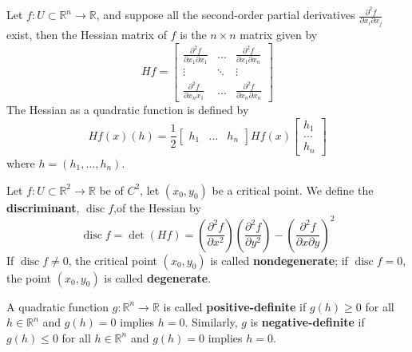 \documentclass[openany]{book}
\newcommand{\R}{\mathbb{R}}
\DeclareMathOperator{\disc}{disc}
\begin{document}
\begin{defn}
    Let $f:U\subset\R^n\to\R$, and suppose all the second-order partial derivatives $\frac{\partial^2 f}{\partial x_i\partial x_j}$ exist, then the Hessian matrix of $f$ is the $n\times n$ matrix given by 
    \begin{equation*}
        Hf=\begin{bmatrix}
            \frac{\partial^2 f}{\partial x_1\partial x_1}&\dots&\frac{\partial^2f}{\partial x_1\partial x_n}\\
            \vdots&\ddots&\vdots\\
            \frac{\partial^2f}{\partial x_nx_1}&\dots&\frac{\partial^2f}{\partial x_n\partial x_n}
        \end{bmatrix}
    \end{equation*}
    The Hessian as a quadratic function is defined by 
    \begin{equation*}
        Hf(x)(h)=\frac{1}{2}\begin{bmatrix}
            h_1&\dots&h_n
        \end{bmatrix}Hf(x)\begin{bmatrix}
            h_1\\
            \dots\\
            h_n
        \end{bmatrix}
    \end{equation*}
    where $h=(h_1,\dots,h_n)$.
\end{defn}

\begin{defn}
    Let $f:U\subset\R^2\to\R$ be of $C^2$, let $(x_0,y_0)$ be a critical point. We define the \textbf{discriminant}, \boldmath $\disc f$,\unboldmath of the Hessian by
    \begin{equation*}
        \disc f=\det (Hf)=\left(\frac{\partial^2f}{\partial x^2}\right)\left(\frac{\partial^2f}{\partial y^2}\right)-\left(\frac{\partial^2f}{\partial x\partial y}\right)^2
    \end{equation*}
    If $\disc f\neq 0$, the critical point $(x_0,y_0)$ is called \textbf{nondegenerate}; if $\disc f=0$, the point $(x_0,y_0)$ is called \textbf{degenerate}.
\end{defn}

\begin{defn}
    A quadratic function $g:\R^n\to\R$ is called \textbf{positive-definite} if $g(h)\geq 0$ for all $h\in\R^n$ and $g(h)=0$ implies $h=0$. Similarly, $g$ is \textbf{negative-definite} if $g(h)\leq 0$ for all $h\in\R^n$ and $g(h)=0$ implies $h=0$. 
\end{defn}
\end{document}
